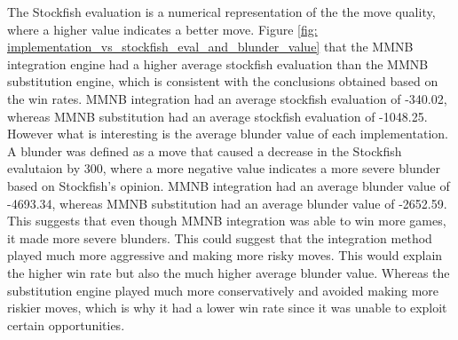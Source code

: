 








The Stockfish evaluation is a numerical representation of the the move quality, where a higher value indicates a better move. Figure \ref{fig: implementation_vs_stockfish_eval_and_blunder_value} that the MMNB integration engine had a higher average stockfish evaluation than the MMNB substitution engine, which is consistent with the conclusions obtained based on the win rates. MMNB integration had an average stockfish evaluation of -340.02, whereas MMNB substitution had an average stockfish evaluation of -1048.25. However what is interesting is the average blunder value of each implementation. A blunder was defined as a move that caused a decrease in the Stockfish evalutaion by 300, where a more negative value indicates a more severe blunder based on Stockfish's opinion. MMNB integration had an average blunder value of -4693.34, whereas MMNB substitution had an average blunder value of -2652.59. This suggests that even though MMNB integration was able to win more games, it made more severe blunders. This could suggest that the integration method played much more aggressive and making more risky moves. This would explain the higher win rate but also the much higher average blunder value. Whereas the substitution engine played much more conservatively and avoided making more riskier moves, which is why it had a lower win rate since it was unable to exploit certain opportunities. 

